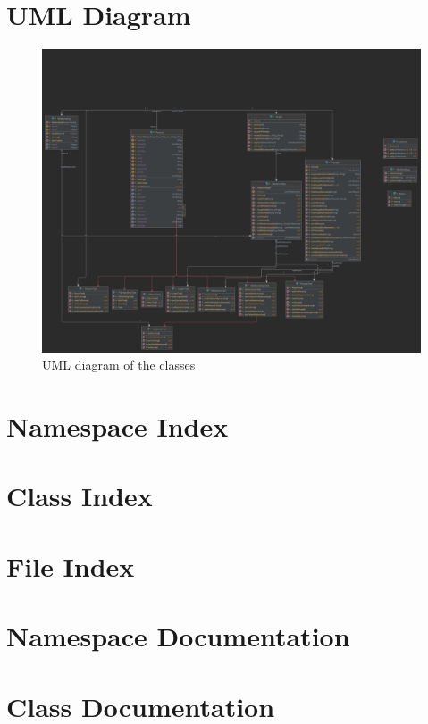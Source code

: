 \documentclass[twoside]{book}
\newcommand{\+}{\discretionary{\mbox{\scriptsize$\hookleftarrow$}}{}{}}
\begin{document}
\chapter{UML Diagram}
\begin{figure}[hbt!]
\includegraphics[width=17cm]{diagrams/src.png}
\centering
\caption{UML diagram of the classes }
\end{figure}




\chapter{Namespace Index}

\chapter{Class Index}

\chapter{File Index}

\chapter{Namespace Documentation}



\chapter{Class Documentation}









\end{document}
